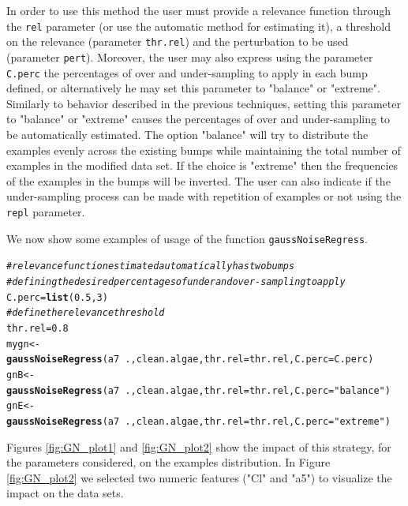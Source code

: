 \documentclass[10pt,a4paper]{article}\usepackage[]{graphicx}\usepackage[]{color}
\makeatletter
\newcommand{\hlnum}[1]{\textcolor[rgb]{0.686,0.059,0.569}{#1}}%
\newcommand{\hlstr}[1]{\textcolor[rgb]{0.192,0.494,0.8}{#1}}%
\newcommand{\hlcom}[1]{\textcolor[rgb]{0.678,0.584,0.686}{\textit{#1}}}%
\newcommand{\hlopt}[1]{\textcolor[rgb]{0,0,0}{#1}}%
\newcommand{\hlstd}[1]{\textcolor[rgb]{0.345,0.345,0.345}{#1}}%
\newcommand{\hlkwb}[1]{\textcolor[rgb]{0.69,0.353,0.396}{#1}}%
\newcommand{\hlkwc}[1]{\textcolor[rgb]{0.333,0.667,0.333}{#1}}%
\newcommand{\hlkwd}[1]{\textcolor[rgb]{0.737,0.353,0.396}{\textbf{#1}}}%
\newenvironment{kframe}{%
 \def\at@end@of@kframe{}%
 \ifinner\ifhmode%
  \def\at@end@of@kframe{\end{minipage}}%
  \begin{minipage}{\columnwidth}%
 \fi\fi%
 \def\FrameCommand##1{\hskip\@totalleftmargin \hskip-\fboxsep
 \colorbox{shadecolor}{##1}\hskip-\fboxsep
     \hskip-\linewidth \hskip-\@totalleftmargin \hskip\columnwidth}%
 \MakeFramed {\advance\hsize-\width
   \@totalleftmargin\z@ \linewidth\hsize
   \@setminipage}}%
 {\par\unskip\endMakeFramed%
 \at@end@of@kframe}
\newenvironment{knitrout}{}{} %
\makeatother
\begin{document}
In order to use this method the user must provide a relevance function through the \texttt{rel} parameter (or use the automatic method for estimating it), a threshold on the relevance (parameter \texttt{thr.rel}) and the perturbation to be used (parameter \texttt{pert}). Moreover, the user may also express using the parameter \texttt{C.perc} the percentages of over and under-sampling to apply in each bump defined, or alternatively he may set this parameter to "balance" or "extreme". Similarly to behavior described in the previous techniques, setting this parameter to "balance" or "extreme" causes the percentages of over and under-sampling to be automatically estimated. The option "balance" will try to distribute the examples evenly across the existing bumps while maintaining the total number of examples in the modified data set. If the choice is "extreme" then the frequencies of the examples in the bumps will be inverted. The user can also indicate if the under-sampling process can be made with repetition of examples or not using the \texttt{repl} parameter.

We now show some examples of usage of the function \texttt{gaussNoiseRegress}.
\begin{knitrout}\footnotesize
{}\color{fgcolor}\begin{kframe}
\begin{alltt}
\hlcom{# relevance function estimated automatically has two bumps}
\hlcom{# defining the desired percentages of under and over-sampling to apply}
\hlstd{C.perc}\hlkwb{=}\hlkwd{list}\hlstd{(}\hlnum{0.5}\hlstd{,} \hlnum{3}\hlstd{)}
\hlcom{# define the relevance threshold}
\hlstd{thr.rel}\hlkwb{=}\hlnum{0.8}
\hlstd{mygn} \hlkwb{<-} \hlkwd{gaussNoiseRegress}\hlstd{(a7}\hlopt{~}\hlstd{., clean.algae,} \hlkwc{thr.rel}\hlstd{=thr.rel,} \hlkwc{C.perc}\hlstd{=C.perc)}
\hlstd{gnB} \hlkwb{<-} \hlkwd{gaussNoiseRegress}\hlstd{(a7}\hlopt{~}\hlstd{., clean.algae,} \hlkwc{thr.rel}\hlstd{=thr.rel,} \hlkwc{C.perc}\hlstd{=}\hlstr{"balance"}\hlstd{)}
\hlstd{gnE} \hlkwb{<-} \hlkwd{gaussNoiseRegress}\hlstd{(a7}\hlopt{~}\hlstd{., clean.algae,} \hlkwc{thr.rel}\hlstd{=thr.rel,} \hlkwc{C.perc}\hlstd{=}\hlstr{"extreme"}\hlstd{)}
\end{alltt}
\end{kframe}
\end{knitrout}

Figures \ref{fig:GN_plot1} and \ref{fig:GN_plot2} show the impact of this strategy, for the parameters considered, on the examples distribution. In Figure \ref{fig:GN_plot2} we selected two numeric features ("Cl" and "a5") to visualize the impact on the data sets.
\end{document}

